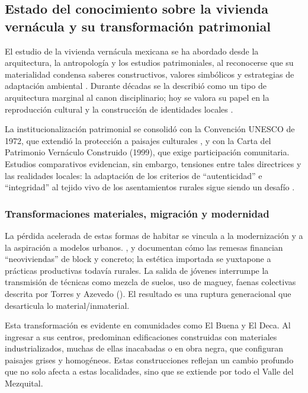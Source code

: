 \subsection{Estado del conocimiento sobre la vivienda vernácula y su transformación patrimonial}

El estudio de la vivienda vernácula mexicana se ha abordado desde la arquitectura, la antropología y los estudios patrimoniales, al reconocerse que su materialidad condensa saberes constructivos, valores simbólicos y estrategias de adaptación ambiental \cite{rudofsky1964, zarate2009arquitectura}.  Durante décadas se la describió como un tipo de arquitectura marginal al canon disciplinario; hoy se valora su papel en la reproducción cultural y la construcción de identidades locales \cite{gonzalez2017arquitectura, icomos1999carta}.

La institucionalización patrimonial se consolidó con la Convención UNESCO de 1972, que extendió la protección a paisajes culturales \cite{UNESCO1972}, y con la Carta del Patrimonio Vernáculo Construido (1999), que exige participación comunitaria.  Estudios comparativos evidencian, sin embargo, tensiones entre tales directrices y las realidades locales: la adaptación de los criterios de ``autenticidad'' e ``integridad'' al tejido vivo de los asentamientos rurales sigue siendo un desafío \cite{venecia1964card, icomos1999carta, prats1998concepto}.

\subsubsection{Transformaciones materiales, migración y modernidad}

La pérdida acelerada de estas formas de habitar se vincula a la modernización y a la aspiración a modelos urbanos. \cite{alvarez2003maguey}, \cite{juarez2018transformacion} y \cite{boils2010remesas} documentan cómo las remesas financian ``neoviviendas'' de block y concreto; la estética importada se yuxtapone a prácticas productivas todavía rurales.  La salida de jóvenes interrumpe la transmisión de técnicas como mezcla de suelos, uso de maguey, faenas colectivas descrita por Torres y Azevedo (\citeyear{torres2021transmision}).  El resultado es una ruptura generacional que desarticula lo material/inmaterial.

Esta transformación es evidente en comunidades como El Buena y El Deca. Al ingresar a sus centros, predominan edificaciones construidas con materiales industrializados, muchas de ellas inacabadas o en obra negra, que configuran paisajes grises y homogéneos. Estas construcciones reflejan un cambio profundo que no solo afecta a estas localidades, sino que se extiende por todo el Valle del Mezquital.

